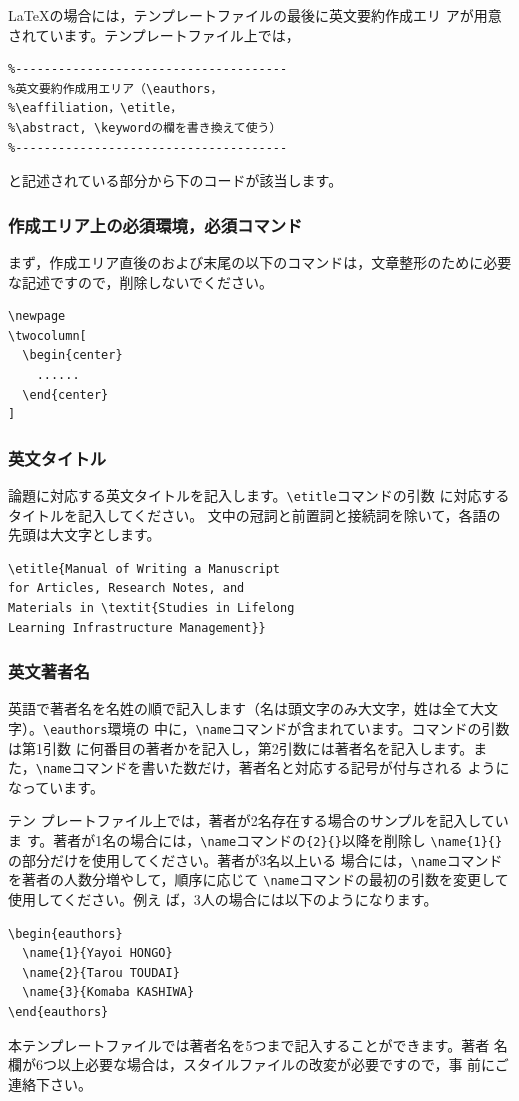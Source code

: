 \documentclass[b5paper,10pt,twocolumn,tombow]{jarticle}
\begin{document}
\LaTeX{}の場合には，テンプレートファイルの最後に英文要約作成エリ
アが用意されています。テンプレートファイル上では，

\small
\begin{verbatim}
%--------------------------------------
%英文要約作成用エリア（\eauthors，
%\eaffiliation，\etitle，
%\abstract, \keywordの欄を書き換えて使う）
%--------------------------------------
\end{verbatim}
\normalsize

と記述されている部分から下のコードが該当します。

\subsubsection{作成エリア上の必須環境，必須コマンド}
まず，作成エリア直後のおよび末尾の以下のコマンドは，文章整形のために必要
な記述ですので，削除しないでください。
\begin{verbatim}
\newpage
\twocolumn[
  \begin{center}
    ......
  \end{center}
]
\end{verbatim}


\subsubsection{英文タイトル}
論題に対応する英文タイトルを記入します。\verb|\etitle|コマンドの引数
に対応するタイトルを記入してください。
文中の冠詞と前置詞と接続詞を除いて，各語の先頭は大文字とします。


\begin{verbatim}
\etitle{Manual of Writing a Manuscript
for Articles, Research Notes, and
Materials in \textit{Studies in Lifelong
Learning Infrastructure Management}}
\end{verbatim}

\subsubsection{英文著者名}
英語で著者名を名姓の順で記入します（名は頭文字のみ大文字，姓は全て大文字）。\verb|\eauthors|環境の
中に，\verb|\name|コマンドが含まれています。コマンドの引数は第1引数
に何番目の著者かを記入し，第2引数には著者名を記入します。ま
た，\verb|\name|コマンドを書いた数だけ，著者名と対応する記号が付与される
ようになっています。


テン
プレートファイル上では，著者が2名存在する場合のサンプルを記入していま
す。著者が1名の場合には，\verb|\name|コマンドの\verb|{2}{}|以降を削除し
\verb|\name{1}{}|の部分だけを使用してください。著者が3名以上いる
場合には，\verb|\name|コマンドを著者の人数分増やして，順序に応じて
\verb|\name|コマンドの最初の引数を変更して使用してください。例え
ば，3人の場合には以下のようになります。
\begin{verbatim}
\begin{eauthors}
  \name{1}{Yayoi HONGO}
  \name{2}{Tarou TOUDAI}
  \name{3}{Komaba KASHIWA}
\end{eauthors}
\end{verbatim}
本テンプレートファイルでは著者名を5つまで記入することができます。著者
名欄が6つ以上必要な場合は，スタイルファイルの改変が必要ですので，事
前にご連絡下さい。
\end{document}
